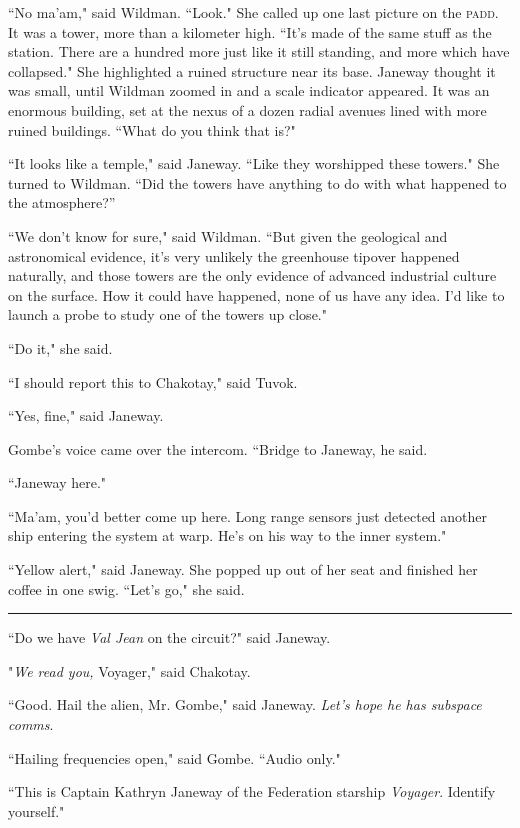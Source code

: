 \documentclass[twoside,letterpaper,12pt]{memoir}
\begin{document}
``No ma'am," said Wildman. ``Look." She called up one last picture on the \textsc{padd}. It was a tower, more than a kilometer high. ``It's made of the same stuff as the station. There are a hundred more just like it still standing, and more which have collapsed." She highlighted a ruined structure near its base. Janeway thought it was small, until Wildman zoomed in and a scale indicator appeared. It was an enormous building, set at the nexus of a dozen radial avenues lined with more ruined buildings. ``What do you think that is?"

``It looks like a temple," said Janeway. ``Like they worshipped these towers." She turned to Wildman. ``Did the towers have anything to do with what happened to the atmosphere?''

``We don't know for sure," said Wildman. ``But given the geological and astronomical evidence, it’s very unlikely the greenhouse tipover happened naturally, and those towers are the only evidence of advanced industrial culture on the surface. How it could have happened, none of us have any idea. I’d like to launch a probe to study one of the towers up close."

``Do it," she said.

``I should report this to Chakotay," said Tuvok.

``Yes, fine," said Janeway.

Gombe's voice came over the intercom. ``Bridge to Janeway, he said.

``Janeway here."

``Ma'am, you'd better come up here. Long range sensors just detected another ship entering the system at warp. He's on his way to the inner system."

``Yellow alert," said Janeway. She popped up out of her seat and finished her coffee in one swig. ``Let's go," she said.

\begin{center}\rule{3cm}{0.4 pt}\end{center}

``Do we have \textit{Val Jean} on the circuit?" said Janeway.

"\textit{We read you, }Voyager," said Chakotay.

``Good. Hail the alien, Mr. Gombe," said Janeway. \textit{Let's hope he has subspace comms}.

``Hailing frequencies open," said Gombe. ``Audio only."

``This is Captain Kathryn Janeway of the Federation starship \textit{Voyager}. Identify yourself."
\end{document}
